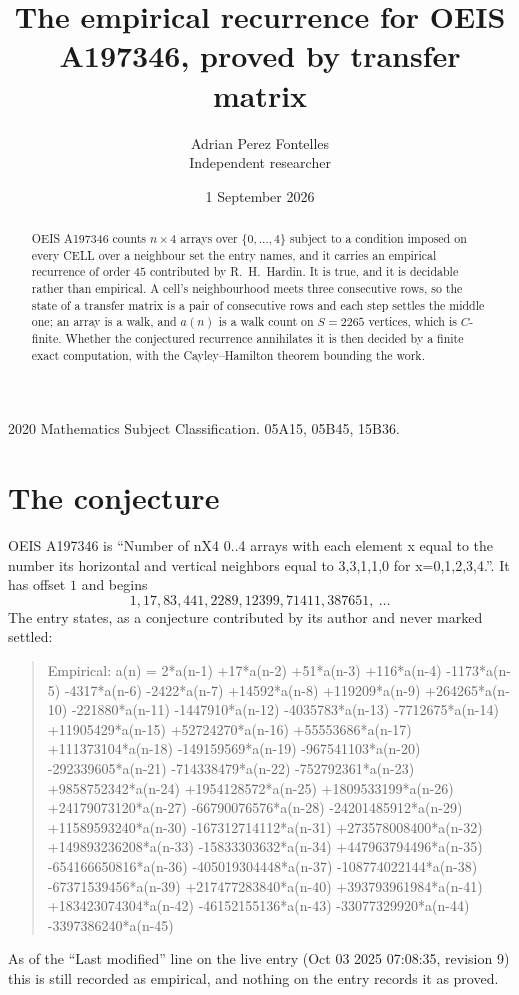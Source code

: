 \documentclass[11pt,a4paper]{article}
\title{The empirical recurrence for OEIS A197346, proved by transfer matrix}
\author{Adrian Perez Fontelles\\ \small Independent researcher}
\date{1 September 2026}
\theoremstyle{plain}
\theoremstyle{definition}
\begin{document}
\maketitle

\begin{abstract}
OEIS A197346 counts $n\times4$ arrays over $\{0,\dots,4\}$ subject to a condition imposed on
every CELL over a neighbour set the entry names, and it carries an empirical recurrence of
order $45$ contributed by R.~H.~Hardin. It is true, and it is decidable rather than
empirical. A cell's neighbourhood meets three consecutive rows, so the state of a transfer
matrix is a pair of consecutive rows and each step settles the middle one; an array is a
walk, and $a(n)$ is a walk count on $S=2265$ vertices, which is $C$-finite. Whether the
conjectured recurrence annihilates it is then decided by a finite exact computation, with the
Cayley--Hamilton theorem bounding the work.
\end{abstract}

\noindent\small 2020 Mathematics Subject Classification. 05A15, 05B45, 15B36.\normalsize

\section{The conjecture}

OEIS A197346 is ``Number of nX4 0..4 arrays with each element x equal to the number its horizontal and vertical neighbors equal to 3,3,1,1,0 for x=0,1,2,3,4.''. It has offset $1$ and begins
\[
1, 17, 83, 441, 2289, 12399, 71411, 387651,\ \dots
\]
The entry states, as a conjecture contributed by its author and never marked settled:
\begin{quote}
Empirical: a(n) = 2*a(n-1) +17*a(n-2) +51*a(n-3) +116*a(n-4) -1173*a(n-5) -4317*a(n-6) -2422*a(n-7) +14592*a(n-8) +119209*a(n-9) +264265*a(n-10) -221880*a(n-11) -1447910*a(n-12) -4035783*a(n-13) -7712675*a(n-14) +11905429*a(n-15) +52724270*a(n-16) +55553686*a(n-17) +111373104*a(n-18) -149159569*a(n-19) -967541103*a(n-20) -292339605*a(n-21) -714338479*a(n-22) -752792361*a(n-23) +9858752342*a(n-24) +1954128572*a(n-25) +1809533199*a(n-26) +24179073120*a(n-27) -66790076576*a(n-28) -24201485912*a(n-29) +11589593240*a(n-30) -167312714112*a(n-31) +273578008400*a(n-32) +149893236208*a(n-33) -15833303632*a(n-34) +447963794496*a(n-35) -654166650816*a(n-36) -405019304448*a(n-37) -108774022144*a(n-38) -67371539456*a(n-39) +217477283840*a(n-40) +393793961984*a(n-41) +183423074304*a(n-42) -46152155136*a(n-43) -33077329920*a(n-44) -3397386240*a(n-45)
\end{quote}
As of the ``Last modified'' line on the live entry (Oct 03 2025 07:08:35, revision 9) this is still
recorded as empirical, and nothing on the entry records it as proved.
\end{document}
